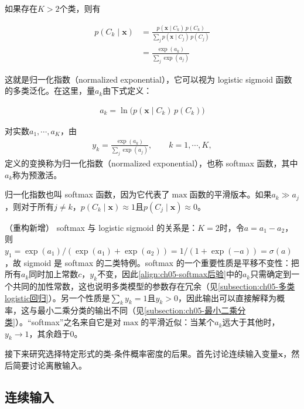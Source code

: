\documentclass[../../main.tex]{subfiles}
\begin{document}
如果存在$K>2$个类，则有

\begin{align}
  p(C_k\mid\boldsymbol{x})&=\frac{p(\boldsymbol{x}\mid C_k)\,p(C_k)}{\sum_j p(\boldsymbol{x}\mid C_j)\,p(C_j)}\nonumber\\
  &=\frac{\exp(a_k)}{\sum_j\exp(a_j)}
  \label{align:ch05-softmax后验}
\end{align}

这就是归一化指数（normalized exponential），它可以视为 logistic sigmoid 函数的多类泛化。在这里，量$a_k$由下式定义：

\begin{align}
  a_k=\ln\bigl(p(\boldsymbol{x}\mid C_k)\,p(C_k)\bigr)
  \label{align:ch05-预激活定义}
\end{align}

\begin{definition}\label{definition:ch05-归一化指数}
对实数$a_1,\cdots,a_K$，由
\begin{align}
  y_k=\frac{\exp(a_k)}{\sum_j\exp(a_j)},\qquad k=1,\cdots,K,
\end{align}
定义的变换称为归一化指数（normalized exponential），也称 softmax 函数，其中$a_k$称为预激活。
\end{definition}

归一化指数也叫 softmax 函数，因为它代表了$\max$函数的平滑版本。如果$a_k\gg a_j$，则对于所有$j\neq k$，$p(C_k\mid\boldsymbol{x})\approx 1$且$p(C_j\mid\boldsymbol{x})\approx 0$。

\begin{remark}（重构新增）
softmax 与 logistic sigmoid 的关系是：$K=2$时，令$a=a_1-a_2$，则$y_1=\exp(a_1)/(\exp(a_1)+\exp(a_2))=1/(1+\exp(-a))=\sigma(a)$，故 sigmoid 是 softmax 的二类特例。softmax 的一个重要性质是平移不变性：把所有$a_k$同时加上常数$c$，$y_k$不变，因此\eqref{align:ch05-softmax后验}中的$a_k$只需确定到一个共同的加性常数，这也说明多类模型的参数存在冗余（见\cref{subsection:ch05-多类logistic回归}）。另一个性质是$\sum_k y_k=1$且$y_k>0$，因此输出可以直接解释为概率，这与最小二乘分类的输出不同（见\cref{subsection:ch05-最小二乘分类}）。“softmax”之名来自它是对$\max$的平滑近似：当某个$a_k$远大于其他时，$y_k\to1$，其余趋于0。
\end{remark}

接下来研究选择特定形式的类-条件概率密度的后果。首先讨论连续输入变量$\boldsymbol{x}$，然后简要讨论离散输入。

\subsection{连续输入}\label{subsection:ch05-连续输入}
\end{document}
